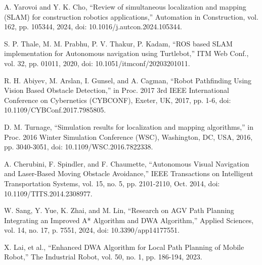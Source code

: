 \documentclass{article}
\begin{document}


\begin{thebibliography}{9}


A. Yarovoi and Y. K. Cho, ``Review of simultaneous localization and mapping (SLAM) for construction robotics applications,'' Automation in Construction, vol. 162, pp. 105344, 2024, doi: 10.1016/j.autcon.2024.105344.

S. P. Thale, M. M. Prabhu, P. V. Thakur, P. Kadam, ``ROS based SLAM implementation for Autonomous navigation using Turtlebot,'' ITM Web Conf., vol. 32, pp. 01011, 2020, doi: 10.1051/itmconf/20203201011.

R. H. Abiyev, M. Arslan, I. Gunsel, and A. Cagman, ``Robot Pathfinding Using Vision Based Obstacle Detection,'' in Proc. 2017 3rd IEEE International Conference on Cybernetics (CYBCONF), Exeter, UK, 2017, pp. 1-6, doi: 10.1109/CYBConf.2017.7985805.

D. M. Turnage, ``Simulation results for localization and mapping algorithms,'' in Proc. 2016 Winter Simulation Conference (WSC), Washington, DC, USA, 2016, pp. 3040-3051, doi: 10.1109/WSC.2016.7822338.

A. Cherubini, F. Spindler, and F. Chaumette, ``Autonomous Visual Navigation and Laser-Based Moving Obstacle Avoidance,'' IEEE Transactions on Intelligent Transportation Systems, vol. 15, no. 5, pp. 2101-2110, Oct. 2014, doi: 10.1109/TITS.2014.2308977.

W. Sang, Y. Yue, K. Zhai, and M. Lin,  ``Research on AGV Path Planning Integrating an Improved A* Algorithm and DWA Algorithm,'' Applied Sciences, vol. 14, no. 17, p. 7551, 2024, doi: 10.3390/app14177551.

X. Lai, et al., ``Enhanced DWA Algorithm for Local Path Planning of Mobile Robot,'' The Industrial Robot, vol. 50, no. 1, pp. 186-194, 2023. 


\end{thebibliography}
\end{document}
